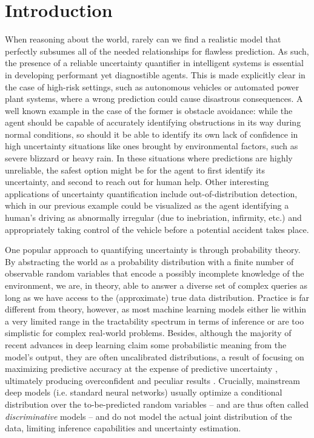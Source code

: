 \chapter{Introduction}

When reasoning about the world, rarely can we find a realistic model that perfectly subsumes all of
the needed relationships for flawless prediction. As such, the presence of a reliable uncertainty
quantifier in intelligent systems is essential in developing performant yet diagnostible agents.
This is made explicitly clear in the case of high-risk settings, such as autonomous vehicles or
automated power plant systems, where a wrong prediction could cause disastrous consequences. A well
known example in the case of the former is obstacle avoidance: while the agent should be capable of
accurately identifying obstructions in its way during normal conditions, so should it be able to
identify its own lack of confidence in high uncertainty situations like ones brought by
environmental factors, such as severe blizzard or heavy rain. In these situations where predictions
are highly unreliable, the safest option might be for the agent to first identify its uncertainty,
and second to reach out for human help. Other interesting applications of uncertainty
quantification include out-of-distribution detection, which in our previous example could be
visualized as the agent identifying a human's driving as abnormally irregular (due to inebriation,
infirmity, etc.) and appropriately taking control of the vehicle before a potential accident takes
place.

One popular approach to quantifying uncertainty is through probability theory. By abstracting the
world as a probability distribution with a finite number of observable random variables that encode
a possibly incomplete knowledge of the environment, we are, in theory, able to answer a diverse set
of complex queries as long as we have access to the (approximate) true data distribution. Practice
is far different from theory, however, as most machine learning models either lie within a very
limited range in the tractability spectrum in terms of inference \citep{pclec} or are too
simplistic for complex real-world problems. Besides, although the majority of recent advances in
deep learning claim some probabilistic meaning from the model's output, they are often uncalibrated
distributions, a result of focusing on maximizing predictive accuracy at the expense of predictive
uncertainty \citep{guo17,yaniv19,chernikova19}, ultimately producing overconfident and peculiar
results \citep{szegedy13,wei18,su19,chernikova19}. Crucially, mainstream deep models (i.e. standard
neural networks) usually optimize a conditional distribution over the to-be-predicted random
variables -- and are thus often called \emph{discriminative} models -- and do not model the actual
joint distribution of the data, limiting inference capabilities and uncertainty estimation.

